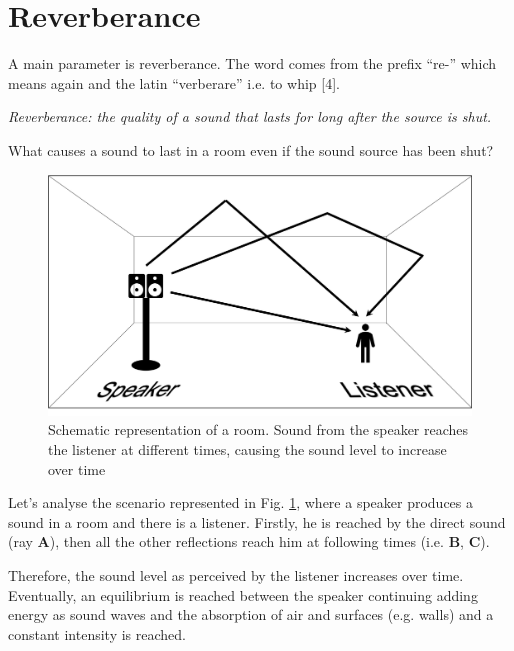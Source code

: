 \documentclass[a4paper]{article}
\begin{document}
\section{Reverberance}
A main parameter is reverberance. The word comes from the prefix “re-” which means again and the latin “verberare” i.e. to whip [4]. 
\\
\begin{tcolorbox}
\textit{Reverberance: the quality of a sound that lasts for long after the source is shut. \cite{book:acoustic3}}
\end{tcolorbox}\par\bigskip
What causes a sound to last in a room even if the sound source has been shut?

\begin{figure}
\centering
\begin{tcolorbox}

\includegraphics[scale=0.22]{reverberant-box}
\caption{Schematic representation of a room. Sound from the speaker reaches the listener at different times, causing the sound level to increase over time}
\label{fig:box}

\end{tcolorbox}\par\bigskip
\end{figure}

Let's analyse the scenario represented in Fig. \ref{fig:box}, where a speaker produces a sound in a room and there is a listener. Firstly, he is reached by the direct sound (ray \textbf{A}), then all the other reflections reach him at following times (i.e. \textbf{B}, \textbf{C}).

Therefore, the sound level as perceived by the listener increases over time. Eventually, an equilibrium is reached between the speaker continuing adding energy as sound waves and the absorption of air and surfaces (e.g. walls) and a constant intensity is reached.
\end{document}
